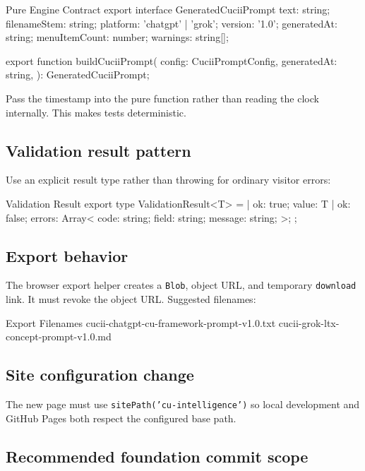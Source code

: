 \documentclass[11pt,letterpaper]{article}
\newcommand{\filepath}[1]{\texttt{#1}}
\begin{document}
\begin{codebox}{Pure Engine Contract}
export interface GeneratedCuciiPrompt {
  text: string;
  filenameStem: string;
  platform: 'chatgpt' | 'grok';
  version: '1.0';
  generatedAt: string;
  menuItemCount: number;
  warnings: string[];
}

export function buildCuciiPrompt(
  config: CuciiPromptConfig,
  generatedAt: string,
): GeneratedCuciiPrompt;
\end{codebox}

Pass the timestamp into the pure function rather than reading the clock internally.
This makes tests deterministic.

\subsection{Validation result pattern}

Use an explicit result type rather than throwing for ordinary visitor errors:

\begin{codebox}{Validation Result}
export type ValidationResult<T> =
  | { ok: true; value: T }
  | {
      ok: false;
      errors: Array<{
        code: string;
        field: string;
        message: string;
      }>;
    };
\end{codebox}

\subsection{Export behavior}

The browser export helper creates a \texttt{Blob}, object URL, and temporary
\texttt{download} link. It must revoke the object URL. Suggested filenames:

\begin{codebox}{Export Filenames}
cucii-chatgpt-cu-framework-prompt-v1.0.txt
cucii-grok-ltx-concept-prompt-v1.0.md
\end{codebox}

\subsection{Site configuration change}

The new page must use \filepath{sitePath('cu-intelligence')} so local development
and GitHub Pages both respect the configured base path.

\subsection{Recommended foundation commit scope}
\end{document}

